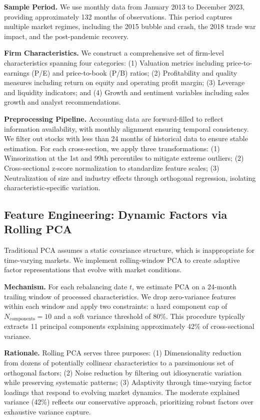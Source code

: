 \documentclass[12pt]{article}
\begin{document}
\textbf{Sample Period.} We use monthly data from January 2013 to December 2023, providing approximately 132 months of observations. This period captures multiple market regimes, including the 2015 bubble and crash, the 2018 trade war impact, and the post-pandemic recovery.

\textbf{Firm Characteristics.} We construct a comprehensive set of firm-level characteristics spanning four categories: (1) Valuation metrics including price-to-earnings (P/E) and price-to-book (P/B) ratios; (2) Profitability and quality measures including return on equity and operating profit margin; (3) Leverage and liquidity indicators; and (4) Growth and sentiment variables including sales growth and analyst recommendations.

\textbf{Preprocessing Pipeline.} Accounting data are forward-filled to reflect information availability, with monthly alignment ensuring temporal consistency. We filter out stocks with less than 24 months of historical data to ensure stable estimation. For each cross-section, we apply three transformations: (1) Winsorization at the 1st and 99th percentiles to mitigate extreme outliers; (2) Cross-sectional z-score normalization to standardize feature scales; (3) Neutralization of size and industry effects through orthogonal regression, isolating characteristic-specific variation.

\subsection{Feature Engineering: Dynamic Factors via Rolling PCA}

Traditional PCA assumes a static covariance structure, which is inappropriate for time-varying markets. We implement rolling-window PCA to create adaptive factor representations that evolve with market conditions.

\textbf{Mechanism.} For each rebalancing date $t$, we estimate PCA on a 24-month trailing window of processed characteristics. We drop zero-variance features within each window and apply two constraints: a hard component cap of $N_{\text{components}} = 10$ and a soft variance threshold of 80\%. This procedure typically extracts 11 principal components explaining approximately 42\% of cross-sectional variance.

\textbf{Rationale.} Rolling PCA serves three purposes: (1) Dimensionality reduction from dozens of potentially collinear characteristics to a parsimonious set of orthogonal factors; (2) Noise reduction by filtering out idiosyncratic variation while preserving systematic patterns; (3) Adaptivity through time-varying factor loadings that respond to evolving market dynamics. The moderate explained variance (42\%) reflects our conservative approach, prioritizing robust factors over exhaustive variance capture.
\end{document}
